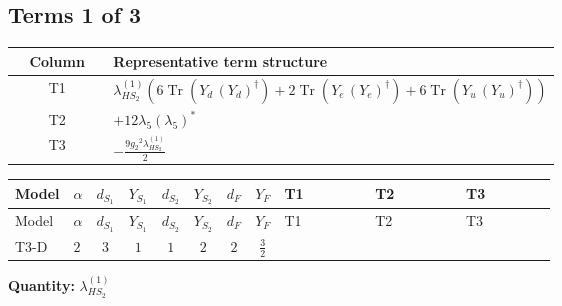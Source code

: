 \documentclass[8pt]{article}
\begin{document}
\begin{landscape}
\subsection*{Terms 1 of 3}
\begin{center}
\begin{tabular}{@{}c >{\raggedright\arraybackslash}p{0.82\linewidth}@{}}
\toprule
Column & Representative term structure \\
\midrule
T1 & \(\displaystyle {\lambda_{HS_2}^{(1)}} (6 \operatorname{Tr}\!\left({Y_d}\,\left({Y_d}\right)^{\dagger}\right)+2 \operatorname{Tr}\!\left({Y_e}\,\left({Y_e}\right)^{\dagger}\right)+6 \operatorname{Tr}\!\left({Y_u}\,\left({Y_u}\right)^{\dagger}\right))\) \\
\midrule
T2 & \(\displaystyle +12 {\lambda_5} \left({\lambda_5}\right)^{*}\) \\
\midrule
T3 & \(\displaystyle -\frac{9 {g_2}^2 {\lambda_{HS_2}^{(1)}}}{2}\) \\
\midrule
\bottomrule
\end{tabular}
\end{center}
\smallskip
\tiny
\begin{longtable}{@{}llcccccc >{\raggedright\arraybackslash}p{0.21\linewidth} >{\raggedright\arraybackslash}p{0.21\linewidth} >{\raggedright\arraybackslash}p{0.21\linewidth}@{}}
\toprule
Model & $\alpha$ & $d_{S_1}$ & $Y_{S_1}$ & $d_{S_2}$ & $Y_{S_2}$ & $d_F$ & $Y_F$ & T1 & T2 & T3 \\
\midrule
\endfirsthead
\toprule
Model & $\alpha$ & $d_{S_1}$ & $Y_{S_1}$ & $d_{S_2}$ & $Y_{S_2}$ & $d_F$ & $Y_F$ & T1 & T2 & T3 \\
\midrule
\endhead
T3-D & $2$ & $3$ & $1$ & $1$ & $2$ & $2$ & $\frac{3}{2}$ & \scriptsize\adjustbox{max width=\linewidth}{$\begin{gathered} {\lambda_{HS_2}^{(1)}} (6 \operatorname{Tr}\!\left({Y_d}\,\left({Y_d}\right)^{\dagger}\right)+2 \operatorname{Tr}\!\left({Y_e}\,\left({Y_e}\right)^{\dagger}\right)+6 \operatorname{Tr}\!\left({Y_u}\,\left({Y_u}\right)^{\dagger}\right))\end{gathered}$} & \scriptsize\adjustbox{max width=\linewidth}{$\begin{gathered} +12 {\lambda_5} \left({\lambda_5}\right)^{*}\end{gathered}$} & \scriptsize\adjustbox{max width=\linewidth}{$\begin{gathered} -\frac{9 {g_2}^2 {\lambda_{HS_2}^{(1)}}}{2}\end{gathered}$} \\
\midrule
\bottomrule
\end{longtable}
\clearpage
\noindent\textbf{Quantity: }$\lambda_{HS_2}^{(1)}$\par\smallskip

\end{landscape}
\end{document}
